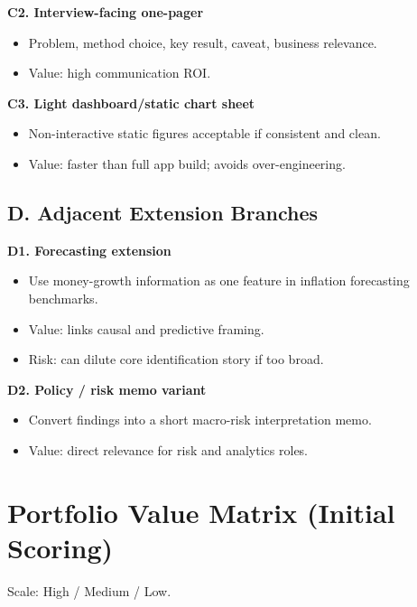\documentclass[11pt]{article}
\begin{document}
\textbf{C2. Interview-facing one-pager}
\begin{itemize}
\item Problem, method choice, key result, caveat, business relevance.
\item Value: high communication ROI.
\end{itemize}

\textbf{C3. Light dashboard/static chart sheet}
\begin{itemize}
\item Non-interactive static figures acceptable if consistent and clean.
\item Value: faster than full app build; avoids over-engineering.
\end{itemize}

\subsection{D. Adjacent Extension Branches}
\textbf{D1. Forecasting extension}
\begin{itemize}
\item Use money-growth information as one feature in inflation forecasting benchmarks.
\item Value: links causal and predictive framing.
\item Risk: can dilute core identification story if too broad.
\end{itemize}

\textbf{D2. Policy / risk memo variant}
\begin{itemize}
\item Convert findings into a short macro-risk interpretation memo.
\item Value: direct relevance for risk and analytics roles.
\end{itemize}

\section{Portfolio Value Matrix (Initial Scoring)}
Scale: High / Medium / Low.
\end{document}
